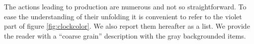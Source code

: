 \documentclass{book}
\begin{document}

The actions leading to production are numerous and not so straightforward. To ease the understanding of their unfolding it is convenient to refer to the violet part of figure \ref{fig:clockcolor}. We also report them hereafter as a list. We provide the reader with a ``coarse grain'' description with the gray backgrounded items.
\end{document}
